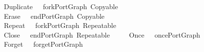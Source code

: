 \ \ {\isacharbar}\ {\isachardoublequoteopen}\ {\isacharparenleft}Duplicate\ \ {\isacharequal}\ forkPortGraph\ {\isacharparenleft}Copyable\ \isanewline
\ \ {\isacharbar}\ {\isachardoublequoteopen}\ {\isacharparenleft}Erase\ \ {\isacharequal}\ endPortGraph\ {\isacharbrackleft}Copyable\ \isanewline
\ \ {\isacharbar}\ {\isachardoublequoteopen}\ {\isacharparenleft}Repeat\ \ {\isacharequal}\ forkPortGraph\ {\isacharparenleft}Repeatable\ \isanewline
\ \ {\isacharbar}\ {\isachardoublequoteopen}\ {\isacharparenleft}Close\ \ {\isacharequal}\ endPortGraph\ {\isacharbrackleft}Repeatable\ \isanewline
\ \ {\isacharbar}\ {\isachardoublequoteopen}\ {\isacharparenleft}Once\ \ {\isacharequal}\ oncePortGraph\ \isanewline
\ \ {\isacharbar}\ {\isachardoublequoteopen}\ {\isacharparenleft}Forget\ \ {\isacharequal}\ forgetPortGraph\ %
